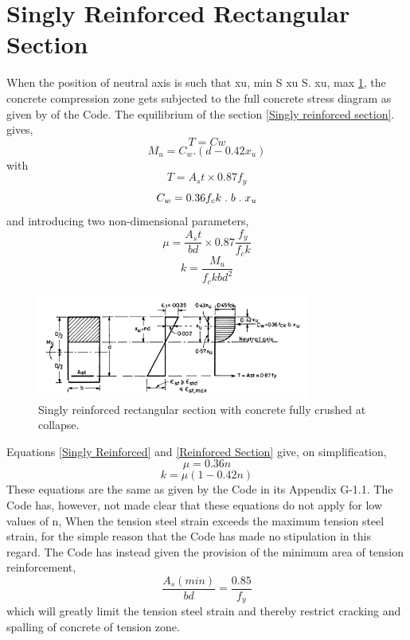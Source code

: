\section{Singly Reinforced Rectangular Section}
When the position of neutral axis is such that xu, min S xu S. xu, max \fig \ref{Singly reinforced section 1}, the concrete
compression zone gets subjected to the full concrete stress diagram as given by  of the
Code. The equilibrium of the section \fig \ref{Singly reinforced section}. gives,
\begin{equation}
T=Cw
\label{Singly Reinforced}
\end{equation}
\begin{equation}
M_u=C_w.(d-0.42x_u)
\label{Reinforced Section}
\end{equation}
with
\hspace{2cm} $$T=A_st \times 0.87f_y$$
$$C_w=0.36f_ck\hspace{0.1cm}.\hspace{0.1cm} b\hspace{0.1cm} .\hspace{0.1cm} x_u$$
and introducing two non-dimensional parameters,
$$\mu=\frac {A_st}{bd} \times 0.87\frac {f_y}{f_ck}$$
$$k=\frac{M_u}{f_ckbd^2}$$
\begin{figure}
\centering
\includegraphics[width=0.8\textwidth]{images/ch2-1.png}
\caption{Singly reinforced rectangular section with concrete fully crushed at collapse.}
\label{Singly reinforced section 1}
\end{figure}
\newpage
Equations \eqn \ref{Singly Reinforced}  and \eqn \ref{Reinforced Section}  give, on simplification,
\begin{equation}
\mu = 0.36n
\label{Concrete}
\end{equation}
\begin{equation}
k=\mu(1-0.42n)
\label{Crushed at collapse}
\end{equation}
These equations are the same as given by the Code in its Appendix G-1.1. The Code has,
however, not made clear that these equations do not apply for low values of n, When the tension
steel strain exceeds the maximum tension steel strain, for the simple reason that the Code
has made no stipulation in this regard. The Code has instead given the provision of the
minimum area of tension reinforcement,
$$\frac{A_s(min)}{bd} = \frac{0.85}{f_y}$$
which will greatly limit the tension steel strain and thereby restrict cracking and spalling of
concrete of tension zone.

